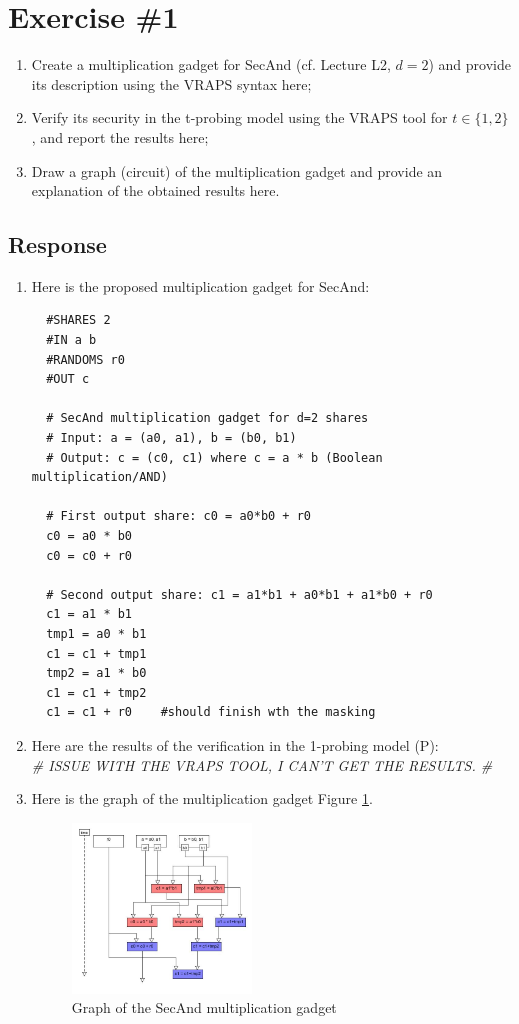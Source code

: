 \documentclass{article}
\begin{document}
\section*{Exercise \#1}

\begin{enumerate}
  \item Create a multiplication gadget for SecAnd (cf. Lecture L2, $d=2$) and provide its description using the VRAPS syntax here;
  \item Verify its security in the t-probing model using the VRAPS tool for $t\in\{1,2\}$, and report the results here;
  \item Draw a graph (circuit) of the multiplication gadget and provide an explanation of the obtained results here.
\end{enumerate}

\subsection*{Response}
\begin{enumerate}
  \item Here is the proposed multiplication gadget for SecAnd:
  \begin{verbatim}
  #SHARES 2
  #IN a b
  #RANDOMS r0
  #OUT c

  # SecAnd multiplication gadget for d=2 shares
  # Input: a = (a0, a1), b = (b0, b1) 
  # Output: c = (c0, c1) where c = a * b (Boolean multiplication/AND)

  # First output share: c0 = a0*b0 + r0
  c0 = a0 * b0
  c0 = c0 + r0

  # Second output share: c1 = a1*b1 + a0*b1 + a1*b0 + r0
  c1 = a1 * b1
  tmp1 = a0 * b1
  c1 = c1 + tmp1
  tmp2 = a1 * b0
  c1 = c1 + tmp2
  c1 = c1 + r0    #should finish wth the masking
  \end{verbatim}
  \item Here are the results of the verification in the 1-probing model (P): \\
  \textit{\# ISSUE WITH THE VRAPS TOOL, I CAN'T GET THE RESULTS. \#}
  \item Here is the graph of the multiplication gadget Figure \ref{fig:secmult_graph}.
  \begin{figure}[hbt]
    \centering
    \includegraphics[width=0.45\textwidth]{secmult_graph.jpg}
    \caption{Graph of the SecAnd multiplication gadget}
    \label{fig:secmult_graph}
  \end{figure}
  
\end{enumerate}
\end{document}
